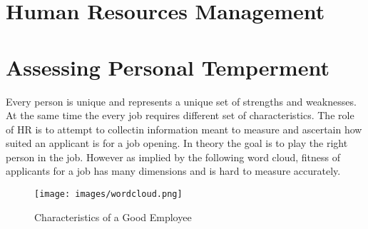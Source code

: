 \documentclass[]{book}
\begin{document}
\hypertarget{human-resources-management}{%
\section{Human Resources Management}\label{human-resources-management}}

\hypertarget{assessing-personal-temperment}{%
\section{Assessing Personal Temperment}\label{assessing-personal-temperment}}

Every person is unique and represents a unique set of strengths and weaknesses. At the same time the every job requires different set of characteristics. The role of HR is to attempt to collectin information meant to measure and ascertain how suited an applicant is for a job opening. In theory the goal is to play the right person in the job. However as implied by the following word cloud, fitness of applicants for a job has many dimensions and is hard to measure accurately.

\begin{figure}
\centering
\texttt{[image: images/wordcloud.png]}
\caption{Characteristics of a Good Employee}
\end{figure}
\end{document}
